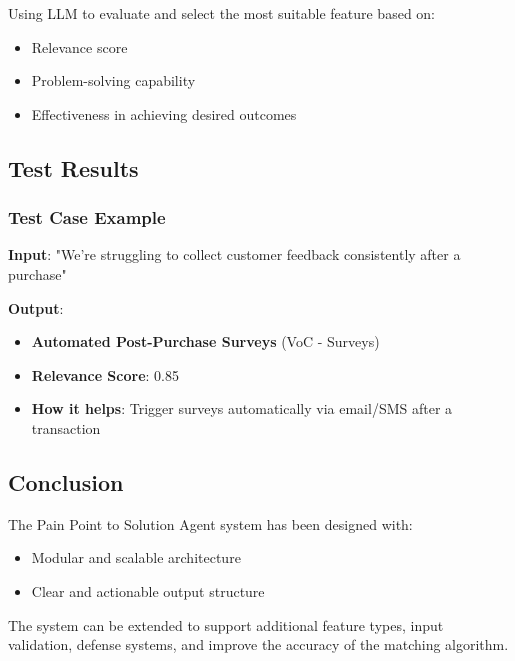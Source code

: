 \documentclass[12pt,a4paper]{article}
\begin{document}
Using LLM to evaluate and select the most suitable feature based on:

\begin{itemize}
    \item Relevance score
    \item Problem-solving capability
    \item Effectiveness in achieving desired outcomes
\end{itemize}

\subsection{Test Results}

\subsubsection{Test Case Example}

\textbf{Input}: "We're struggling to collect customer feedback consistently after a purchase"

\textbf{Output}: 
\begin{itemize}
    \item \textbf{Automated Post-Purchase Surveys} (VoC - Surveys)
    \item \textbf{Relevance Score}: 0.85
    \item \textbf{How it helps}: Trigger surveys automatically via email/SMS after a transaction
\end{itemize}

\subsection{Conclusion}

The Pain Point to Solution Agent system has been designed with:

\begin{itemize}
    \item Modular and scalable architecture
    \item Clear and actionable output structure
\end{itemize}

The system can be extended to support additional feature types, input validation, defense systems, and improve the accuracy of the matching algorithm.
\end{document}
